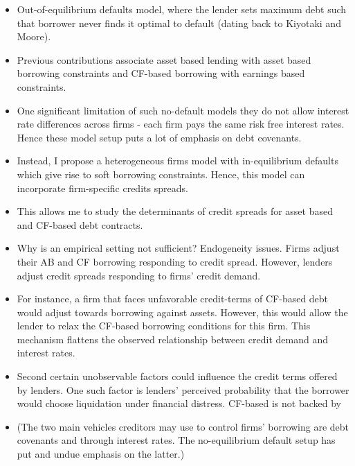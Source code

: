 \documentclass[12pt]{article}
\begin{document}
\begin{itemize}\setlength\itemsep{0em} \small
    \item Out-of-equilibrium defaults model, where the lender sets maximum debt such that borrower never finds it optimal to default (dating back to Kiyotaki and Moore). 
    \item Previous contributions associate asset based lending with asset based borrowing constraints and CF-based borrowing with earnings based constraints.    
    \item One significant limitation of such no-default models they do not allow interest rate differences across firms - each firm pays the same risk free interest rates. Hence these model setup puts a lot of emphasis on debt covenants. 
    \item Instead, I propose a heterogeneous firms model with in-equilibrium defaults which give rise to soft borrowing constraints. Hence, this model can incorporate firm-specific credits spreads. 
    \item This allows me to study the determinants of credit spreads for asset based and CF-based debt contracts.
    \item Why is an empirical setting not sufficient? Endogeneity issues. Firms adjust their AB and CF borrowing responding to credit spread. However, lenders adjust credit spreads responding to firms' credit demand. 
    \item For instance, a firm that faces unfavorable credit-terms of CF-based debt would adjust towards borrowing against assets. However, this would allow the lender to relax the CF-based borrowing conditions for this firm. This mechanism flattens the observed relationship between credit demand and interest rates. 
    \item Second certain unobservable factors could influence the credit terms offered by lenders. One such factor is lenders' perceived probability that the borrower would choose liquidation under financial distress. CF-based is not backed by 
    \item (The two main vehicles creditors may use to control firms' borrowing are debt covenants and through interest rates. The no-equilibrium default setup has put and undue emphasis on the latter.)
\end{itemize} \normalsize
\end{document}
